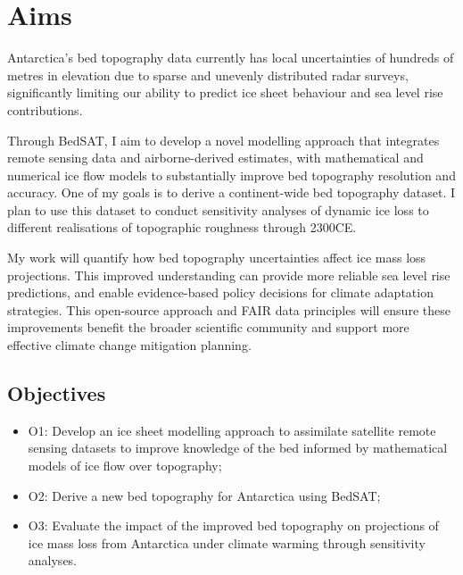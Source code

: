 \chapter{Aims}
Antarctica's bed topography data currently has local uncertainties of hundreds of metres in elevation due to sparse and unevenly distributed radar surveys, significantly limiting our ability to predict ice sheet behaviour and sea level rise contributions. 

Through BedSAT, I aim to develop a novel modelling approach that integrates remote sensing data and airborne-derived estimates, with mathematical and numerical ice flow models to substantially improve bed topography resolution and accuracy. One of my goals is to derive a continent-wide bed topography dataset. I plan to use this dataset to conduct sensitivity analyses of dynamic ice loss to different realisations of topographic roughness through 2300CE.

My work will quantify how bed topography uncertainties affect ice mass loss projections. This improved understanding can provide more reliable sea level rise predictions, and enable evidence-based policy decisions for climate adaptation strategies. This open-source approach and FAIR data principles will ensure these improvements benefit the broader scientific community and support more effective climate change mitigation planning.

\section{Objectives}
\begin{itemize}
    \item{O1:} Develop an ice sheet modelling approach to assimilate satellite remote sensing datasets to improve knowledge of the bed informed by mathematical models of ice flow over topography;
    \item{O2:} Derive a new bed topography for Antarctica using BedSAT;
    \item{O3:} Evaluate the impact of the improved bed topography on projections of ice mass loss from Antarctica under climate warming through sensitivity analyses. 
\end{itemize}